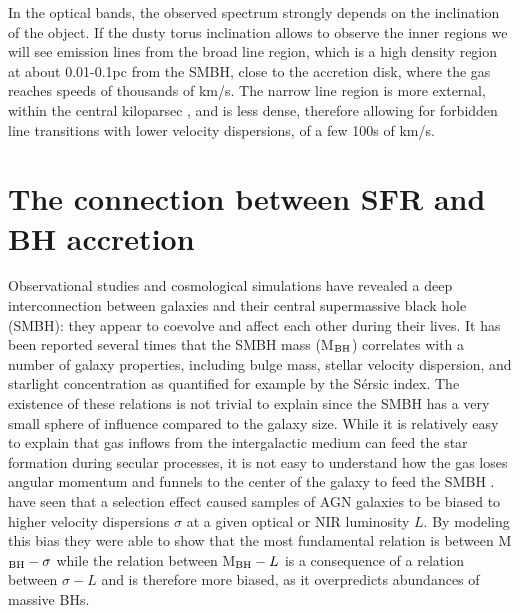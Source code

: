 In the optical bands, the observed spectrum strongly depends on the inclination of the object. If the dusty torus inclination allows to observe the inner regions we will see emission lines from the broad line region, which is a high density region at about 0.01-0.1pc from the SMBH, close to the accretion disk, where the gas reaches speeds of thousands of km/s. The narrow line region is more external, within the central kiloparsec \citep[e.g.][]{2015MNRAS.454.4452H,2016MNRAS.460..130V}, and is less dense, therefore allowing for forbidden line transitions with lower velocity dispersions, of a few 100s of km/s.

\section{The connection between SFR and BH accretion}
Observational studies and cosmological simulations have revealed a deep interconnection between galaxies and their central supermassive black hole (SMBH): they appear to coevolve and affect each other during their lives.
It has been reported several times that the SMBH mass (M$_{\rm BH}$) correlates with a number of galaxy properties, including bulge mass, stellar velocity dispersion, and starlight concentration as quantified for example by the S\'{e}rsic index. The existence of these relations is not trivial to explain since the SMBH has a very small sphere of influence compared to the galaxy size. While it is relatively easy to explain that gas inflows from the intergalactic medium can feed the star formation during secular processes, it is not easy to understand how the gas loses angular momentum and funnels to the center of the galaxy to feed the SMBH \citep{2019NatAs...3...48S}. %
\citet{2007ApJ...660..267B} have seen that a selection effect caused samples of AGN galaxies to be biased to higher velocity dispersions $\sigma$ at a given optical or NIR luminosity $L$. By modeling this bias they were able to show
that the most fundamental relation is between M$_{\rm BH}-\sigma$ while the relation between M$_{\rm BH}- L$ is a consequence of a relation between $\sigma-L$ and is therefore more biased, as it overpredicts abundances of massive BHs. %

